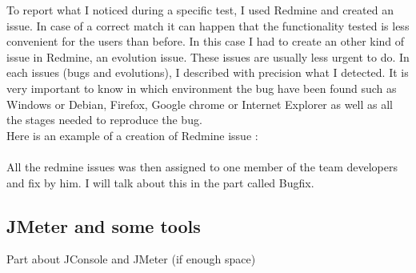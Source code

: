  To report what I noticed during a specific test, I used Redmine and created an issue.
 In case of a correct match it can happen that the functionality tested is less convenient
 for the users than before. In this case I had to create an other kind of issue in Redmine,
 an evolution issue. These issues are usually less urgent to do. 
In each issues (bugs and evolutions), I described with precision what I detected. 
It is very  important to know in which environment the bug have been found such as 
Windows or Debian, Firefox, Google chrome or Internet Explorer as well as 
all the stages needed to reproduce the bug.  \\ 

Here is an example of a creation of Redmine issue : \\ 

 \\

All the redmine issues was then assigned to one member of the team developers and fix by
him. I will talk about this in the part called Bugfix. 


\newpage

\subsection{JMeter and some tools}
Part about JConsole and JMeter (if enough space)



